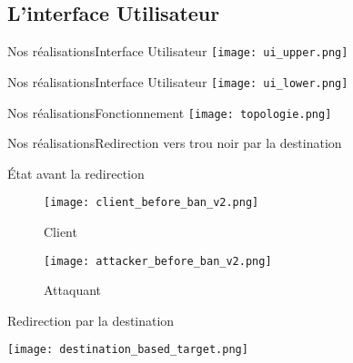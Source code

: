 \subsection{L'interface Utilisateur}

\begin{frame}{Nos réalisations}{Interface Utilisateur}
    \texttt{[image: ui\_upper.png]}
\end{frame}

\begin{frame}{Nos réalisations}{Interface Utilisateur}
    \texttt{[image: ui\_lower.png]}
\end{frame}

\begin{frame}{Nos réalisations}{Fonctionnement}
    \texttt{[image: topologie.png]}
\end{frame}

\begin{frame}{Nos réalisations}{Redirection vers trou noir par la destination}
    {\large \centerline{État avant la redirection}}
    \begin{minipage}{0.49\textwidth}
        \begin{figure}[H]
            \texttt{[image: client\_before\_ban\_v2.png]}
            \caption*{Client}
        \end{figure}
    \end{minipage}
    \hfill
    \begin{minipage}{0.49\textwidth}
        \begin{figure}[H]
            \texttt{[image: attacker\_before\_ban\_v2.png]}
            \caption*{Attaquant}
        \end{figure}
    \end{minipage}

    \hfill
    {\large \centerline{Redirection par la destination}}
    \hspace{20cm}
    \texttt{[image: destination\_based\_target.png]}
\end{frame}

